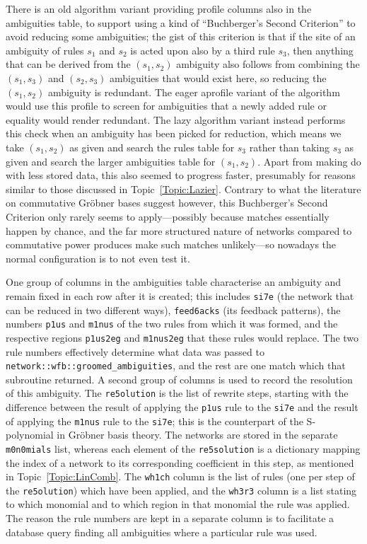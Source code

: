 \documentclass{article}
\theoremstyle{definition}
\begin{document}
There is an old algorithm variant providing profile columns also in 
the ambiguities table, to support using a kind of ``Buchberger's 
Second Criterion'' to avoid reducing some ambiguities; the gist of 
this criterion is that if the site of an ambiguity of rules $s_1$ and 
$s_2$ is acted upon also by a third rule $s_3$, then anything that 
can be derived from the $(s_1,s_2)$ ambiguity also follows from 
combining the $(s_1,s_3)$ and $(s_2,s_3)$ ambiguities that would exist 
here, so reducing the $(s_1,s_2)$ ambiguity is redundant. The eager 
\textsf{aprofile} variant of the algorithm would use this profile to 
screen for ambiguities that a newly added rule or equality would 
render redundant. The \textsf{lazy} algorithm variant instead 
performs this check when an ambiguity has been picked for reduction, 
which means we take $(s_1,s_2)$ as given and search the rules table 
for $s_3$ rather than taking $s_3$ as given and search the larger 
ambiguities table for $(s_1,s_2)$. Apart from making do with less 
stored data, this also seemed to progress faster, presumably for 
reasons similar to those discussed in Topic~\ref{Topic:Lazier}. 
Contrary to what the literature on commutative Gr\"obner bases 
suggest however, this Buchberger's Second Criterion only rarely seems 
to apply---possibly because matches essentially happen by chance, and 
the far more structured nature of networks compared to commutative 
power produces make such matches unlikely---so nowadays the normal 
configuration is to not even test it.

One group of columns in the ambiguities table characterise an 
ambiguity and remain fixed in each row after it is created; this 
includes \texttt{si7e} (the network that can be reduced in two 
different ways), \texttt{feed6acks} (its feedback patterns), the 
numbers \texttt{p1us} and \texttt{m1nus} of the two rules from which 
it was formed, and the respective regions \texttt{p1us2eg} and 
\texttt{m1nus2eg} that these rules would replace. The two rule 
numbers effectively determine what data was passed to 
\texttt{network::wfb:}\verb|:groomed_ambiguities|, and the rest are 
one match which that subroutine returned. A second group of columns 
is used to record the resolution of this ambiguity. The 
\texttt{re5olution} is the list of rewrite steps, starting with the 
difference between the result of applying the \texttt{p1us} rule to 
the \texttt{si7e} and the result of applying the \texttt{m1nus} rule 
to the \texttt{si7e}; this is the counterpart of the S-polynomial in 
Gr\"obner basis theory. The networks are stored in the separate 
\texttt{m0n0mials} list, whereas each element of the 
\texttt{re5solution} is a dictionary mapping the index of a network 
to its corresponding coefficient in this step, as mentioned in 
Topic~\ref{Topic:LinComb}. The \texttt{wh1ch} column is the list of 
rules (one per step of the \texttt{re5olution}) which have been 
applied, and the \texttt{wh3r3} column is a list stating to which 
monomial and to which region in that monomial the rule was applied. 
The reason the rule numbers are kept in a separate column is to 
facilitate a database query finding all ambiguities where a particular 
rule was used.
\end{document}
